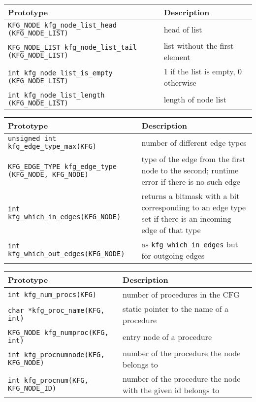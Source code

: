 \begin{longtable}{|p{} | p{}|}
\hline
Prototype & Description \\
\hline
\hline \endhead
\verb|KFG_NODE kfg_node_list_head| \verb|(KFG_NODE_LIST)|
    & head of list \\
\hline
\verb|KFG_NODE_LIST kfg_node_list_tail| \verb|(KFG_NODE_LIST)|
    & list without the first element \\
\hline
\verb|int kfg_node_list_is_empty| \verb|(KFG_NODE_LIST)|
    & 1 if the list is empty, 0 otherwise \\
\hline
\verb|int kfg_node_list_length| \verb|(KFG_NODE_LIST)|
    & length of node list \\
\hline
\end{longtable}

\begin{longtable}{|p{} | p{}|}
\hline
Prototype & Description \\
\hline
\hline \endhead
\verb|unsigned int kfg_edge_type_max(KFG)|
    & number of different edge types \\
\hline
\verb|KFG_EDGE_TYPE kfg_edge_type| \verb|(KFG_NODE, KFG_NODE)|
    & type of the edge from the first node to the second; runtime error
      if there is no such edge \\
\hline
\verb|int kfg_which_in_edges(KFG_NODE)|
    & returns a bitmask with a bit corresponding to an edge type set
      if there is an incoming edge of that type \\
\hline
\verb|int kfg_which_out_edges(KFG_NODE)|
    & as \verb|kfg_which_in_edges| but for outgoing edges \\
\hline
\end{longtable}

\begin{longtable}{|p{} | p{}|}
\hline
Prototype & Description \\
\hline
\hline \endhead
\verb|int kfg_num_procs(KFG)|
    & number of procedures in the CFG \\
\hline
\verb|char *kfg_proc_name(KFG, int)|
    & static pointer to the name of a procedure \\
\hline
\verb|KFG_NODE kfg_numproc(KFG, int)|
    & entry node of a procedure \\
\hline
\verb|int kfg_procnumnode(KFG, KFG_NODE)|
    & number of the procedure the node belongs to \\
\hline
\verb|int kfg_procnum(KFG, KFG_NODE_ID)|
    & number of the procedure the node with the given id belongs to \\
\hline
\end{longtable}

